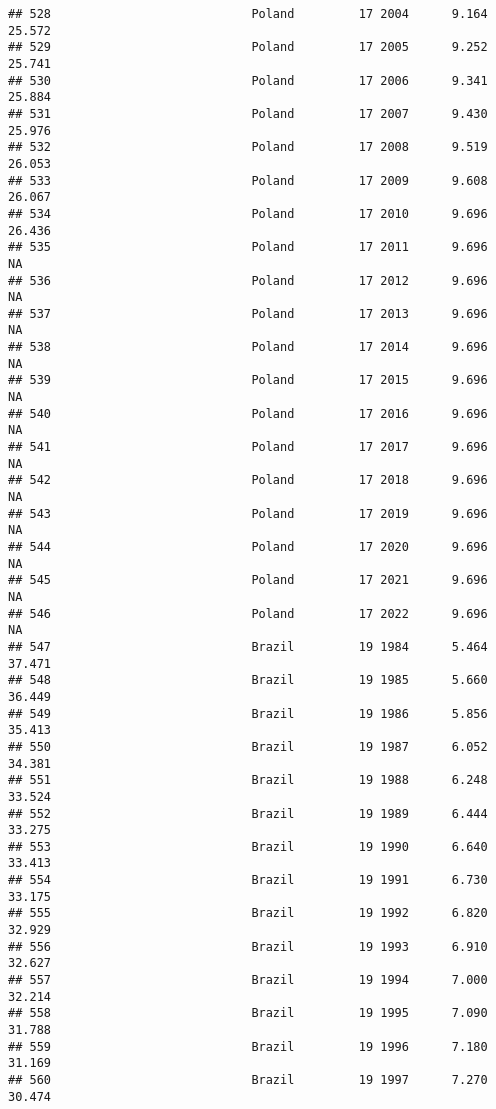 \documentclass[
]{article}
\begin{document}
\begin{verbatim}
## 528                            Poland         17 2004      9.164     25.572
## 529                            Poland         17 2005      9.252     25.741
## 530                            Poland         17 2006      9.341     25.884
## 531                            Poland         17 2007      9.430     25.976
## 532                            Poland         17 2008      9.519     26.053
## 533                            Poland         17 2009      9.608     26.067
## 534                            Poland         17 2010      9.696     26.436
## 535                            Poland         17 2011      9.696         NA
## 536                            Poland         17 2012      9.696         NA
## 537                            Poland         17 2013      9.696         NA
## 538                            Poland         17 2014      9.696         NA
## 539                            Poland         17 2015      9.696         NA
## 540                            Poland         17 2016      9.696         NA
## 541                            Poland         17 2017      9.696         NA
## 542                            Poland         17 2018      9.696         NA
## 543                            Poland         17 2019      9.696         NA
## 544                            Poland         17 2020      9.696         NA
## 545                            Poland         17 2021      9.696         NA
## 546                            Poland         17 2022      9.696         NA
## 547                            Brazil         19 1984      5.464     37.471
## 548                            Brazil         19 1985      5.660     36.449
## 549                            Brazil         19 1986      5.856     35.413
## 550                            Brazil         19 1987      6.052     34.381
## 551                            Brazil         19 1988      6.248     33.524
## 552                            Brazil         19 1989      6.444     33.275
## 553                            Brazil         19 1990      6.640     33.413
## 554                            Brazil         19 1991      6.730     33.175
## 555                            Brazil         19 1992      6.820     32.929
## 556                            Brazil         19 1993      6.910     32.627
## 557                            Brazil         19 1994      7.000     32.214
## 558                            Brazil         19 1995      7.090     31.788
## 559                            Brazil         19 1996      7.180     31.169
## 560                            Brazil         19 1997      7.270     30.474

\end{verbatim}
\end{document}
